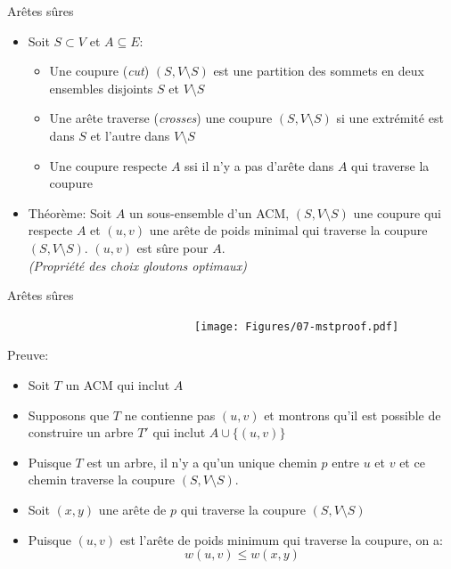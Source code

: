\begin{frame}{Arêtes sûres}
\begin{itemize}
\item Soit $S\subset V$ et $A\subseteq E$:
\begin{itemize}
\item Une \alert{coupure} ({\it cut}) $(S,V\setminus S)$ est une partition des sommets en deux ensembles disjoints $S$ et $V\setminus S$
\item Une arête \alert{traverse} ({\it crosses}) une coupure $(S,V\setminus
  S)$ si une extrémité est dans $S$ et l'autre dans $V\setminus S$
\item Une coupure \alert{respecte} $A$ ssi il n'y a pas d'arête dans $A$ qui traverse la coupure
\end{itemize}

\bigskip

\item \alert{Théorème:} Soit $A$ un sous-ensemble d'un ACM,
  $(S,V\setminus S)$ une coupure qui respecte $A$ et $(u,v)$ une arête
  de \alert{poids minimal} qui traverse la coupure $(S,V\setminus
  S)$. $(u,v)$ est sûre pour $A$.\\
\medskip
{\it (Propriété des choix gloutons optimaux)}
\end{itemize}

\end{frame}

\begin{frame}{Arêtes sûres}

\centerline{~~~~~~~~~~~~~~~~~~~~~~~~~~~~~~\texttt{[image: Figures/07-mstproof.pdf]}}
\vspace{-0.8cm}
\alert{Preuve:}
\begin{itemize}
\item Soit $T$ un ACM qui inclut $A$ %
\item Supposons que $T$ ne contienne pas $(u,v)$ et montrons qu'il est possible de construire un arbre $T'$ qui inclut $A\cup\{(u,v)\}$
\item Puisque $T$ est un arbre, il n'y a qu'un unique chemin $p$ entre
  $u$ et $v$ et ce chemin traverse la coupure $(S,V\setminus S)$.
\item Soit $(x,y)$ une arête de $p$ qui traverse la coupure $(S,V\setminus S)$
\item Puisque $(u,v)$ est l'arête de poids minimum qui traverse la coupure, on a:
$$w(u,v)\leq w(x,y)$$
\end{itemize}

\end{frame}

